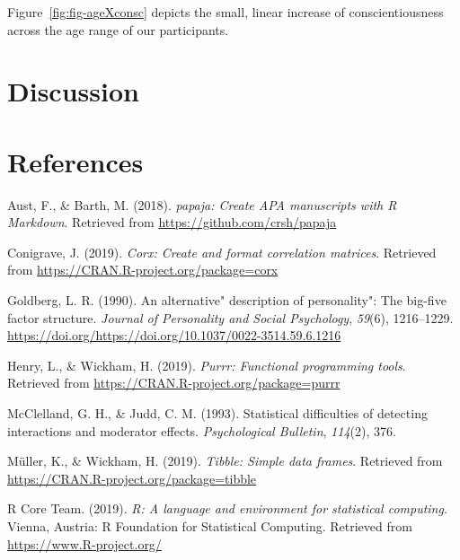 \documentclass[
  english,
  man]{apa6}
\begin{document}
Figure~\ref{fig:fig-ageXconsc} depicts the small, linear increase of conscientiousness across the age range of our participants.

\hypertarget{discussion}{%
\section{Discussion}\label{discussion}}

\newpage

\hypertarget{references}{%
\section{References}\label{references}}

\begingroup
\setlength{\parindent}{-0.5in}
\setlength{\leftskip}{0.5in}

\hypertarget{refs}{}
\leavevmode\hypertarget{ref-R-papaja}{}%
Aust, F., \& Barth, M. (2018). \emph{papaja: Create APA manuscripts with R Markdown}. Retrieved from \url{https://github.com/crsh/papaja}

\leavevmode\hypertarget{ref-R-corx}{}%
Conigrave, J. (2019). \emph{Corx: Create and format correlation matrices}. Retrieved from \url{https://CRAN.R-project.org/package=corx}

\leavevmode\hypertarget{ref-goldberg1990alternative}{}%
Goldberg, L. R. (1990). An alternative" description of personality": The big-five factor structure. \emph{Journal of Personality and Social Psychology}, \emph{59}(6), 1216--1229. \url{https://doi.org/https://doi.org/10.1037/0022-3514.59.6.1216}

\leavevmode\hypertarget{ref-R-purrr}{}%
Henry, L., \& Wickham, H. (2019). \emph{Purrr: Functional programming tools}. Retrieved from \url{https://CRAN.R-project.org/package=purrr}

\leavevmode\hypertarget{ref-mcclelland1993statistical}{}%
McClelland, G. H., \& Judd, C. M. (1993). Statistical difficulties of detecting interactions and moderator effects. \emph{Psychological Bulletin}, \emph{114}(2), 376.

\leavevmode\hypertarget{ref-R-tibble}{}%
Müller, K., \& Wickham, H. (2019). \emph{Tibble: Simple data frames}. Retrieved from \url{https://CRAN.R-project.org/package=tibble}

\leavevmode\hypertarget{ref-R-base}{}%
R Core Team. (2019). \emph{R: A language and environment for statistical computing}. Vienna, Austria: R Foundation for Statistical Computing. Retrieved from \url{https://www.R-project.org/}
\end{document}
